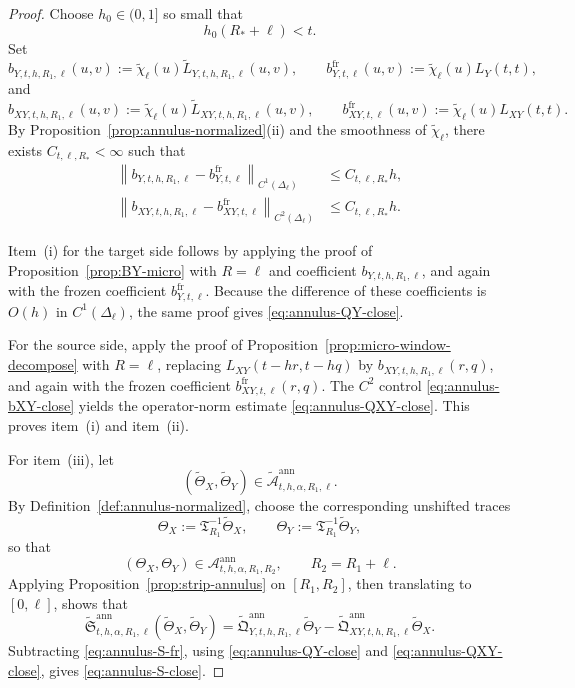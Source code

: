 \documentclass[11pt,a4paper]{amsart}
\theoremstyle{plain}
\theoremstyle{definition}
\theoremstyle{remark}
\begin{document}
\begin{proof}
Choose \(h_0\in(0,1]\) so small that
\[
h_0(R_*+\ell)<t.
\]
Set
\[
b_{Y,t,h,R_1,\ell}(u,v)
:=
\widetilde\chi_\ell(u)\widetilde L_{Y,t,h,R_1,\ell}(u,v),
\qquad
b_{Y,t,\ell}^{\mathrm{fr}}(u,v)
:=
\widetilde\chi_\ell(u)L_Y(t,t),
\]
and
\[
b_{XY,t,h,R_1,\ell}(u,v)
:=
\widetilde\chi_\ell(u)\widetilde L_{XY,t,h,R_1,\ell}(u,v),
\qquad
b_{XY,t,\ell}^{\mathrm{fr}}(u,v)
:=
\widetilde\chi_\ell(u)L_{XY}(t,t).
\]
By Proposition~\ref{prop:annulus-normalized}(ii) and the smoothness of \(\widetilde\chi_\ell\),
there exists \(C_{t,\ell,R_*}<\infty\) such that
\begin{align}
\left\|
b_{Y,t,h,R_1,\ell}-b_{Y,t,\ell}^{\mathrm{fr}}
\right\|_{C^1(\Delta_\ell)}
&\le
C_{t,\ell,R_*}h,
\label{eq:annulus-bY-close}\\
\left\|
b_{XY,t,h,R_1,\ell}-b_{XY,t,\ell}^{\mathrm{fr}}
\right\|_{C^2(\Delta_\ell)}
&\le
C_{t,\ell,R_*}h.
\label{eq:annulus-bXY-close}
\end{align}

Item~(i) for the target side follows by applying the proof of
Proposition~\ref{prop:BY-micro} with \(R=\ell\) and coefficient \(b_{Y,t,h,R_1,\ell}\), and
again with the frozen coefficient \(b_{Y,t,\ell}^{\mathrm{fr}}\). Because the difference of these
coefficients is \(O(h)\) in \(C^1(\Delta_\ell)\), the same proof gives
\eqref{eq:annulus-QY-close}.

For the source side, apply the proof of Proposition~\ref{prop:micro-window-decompose} with
\(R=\ell\), replacing \(L_{XY}(t-h r,t-h q)\) by \(b_{XY,t,h,R_1,\ell}(r,q)\), and again with the
frozen coefficient \(b_{XY,t,\ell}^{\mathrm{fr}}(r,q)\). The \(C^2\) control
\eqref{eq:annulus-bXY-close} yields the operator-norm estimate \eqref{eq:annulus-QXY-close}. This
proves item~(i) and item~(ii).

For item~(iii), let
\[
(\widetilde\Theta_X,\widetilde\Theta_Y)\in
\widetilde{\mathcal A}_{t,h,\alpha,R_1,\ell}^{\mathrm{ann}}.
\]
By Definition~\ref{def:annulus-normalized}, choose the corresponding unshifted traces
\[
\Theta_X:=\mathfrak T_{R_1}^{-1}\widetilde\Theta_X,
\qquad
\Theta_Y:=\mathfrak T_{R_1}^{-1}\widetilde\Theta_Y,
\]
so that
\[
(\Theta_X,\Theta_Y)\in \mathcal A_{t,h,\alpha,R_1,R_2}^{\mathrm{ann}},
\qquad
R_2=R_1+\ell.
\]
Applying Proposition~\ref{prop:strip-annulus} on \([R_1,R_2]\), then translating to
\([0,\ell]\), shows that
\[
\widetilde{\mathfrak S}_{t,h,\alpha,R_1,\ell}^{\mathrm{ann}}
(\widetilde\Theta_X,\widetilde\Theta_Y)
=
\widetilde{\mathfrak Q}_{Y,t,h,R_1,\ell}^{\mathrm{ann}}\widetilde\Theta_Y
-
\widetilde{\mathfrak Q}_{XY,t,h,R_1,\ell}^{\mathrm{ann}}\widetilde\Theta_X.
\]
Subtracting \eqref{eq:annulus-S-fr}, using \eqref{eq:annulus-QY-close} and
\eqref{eq:annulus-QXY-close}, gives \eqref{eq:annulus-S-close}.
\end{proof}
\end{document}

